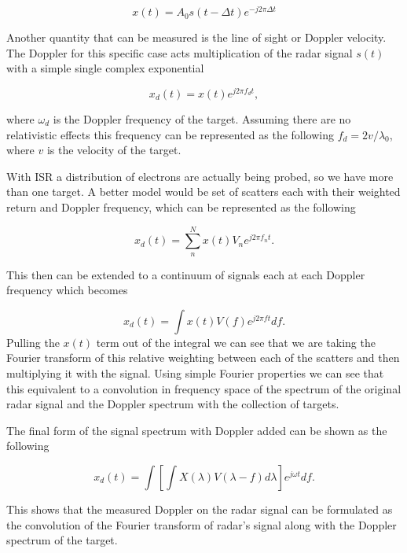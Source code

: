\begin{equation}
\label{eqn:baseband}
x(t)=A_0s(t-\Delta t)e^{-j2\pi\Delta t}
\end{equation}

Another quantity that can be measured is the line of sight or Doppler velocity. The Doppler for this specific case acts multiplication of the radar signal $s(t)$ with a simple single complex exponential

\begin{equation}
\label{simpledop}
x_d(t) = x(t)e^{j2\pi f_d t},
\end{equation}
 
\noindent where $\omega_d$ is the Doppler frequency of the target. Assuming there are no relativistic effects this frequency can be represented as the following $f_d = 2v/\lambda_0 $, where $v$ is the velocity of the target. 

With ISR a distribution of electrons are actually being probed, so we have more than one target. A better model would be set of scatters each with their weighted return and Doppler frequency, which can be represented as the following

\begin{equation}
\label{multiDop}
\displaystyle x_d(t) = \sum_{n}^{N} x(t)V_ne^{j2\pi f_{n} t}.
\end{equation}

\noindent This then can be extended to a continuum of signals each at each Doppler frequency which becomes

\begin{equation}
\label{conDop}
x_d(t) = \int x(t) V(f)e^{j2\pi ft} df.
\end{equation}
\noindent Pulling the $x(t)$ term out of the integral we can see that we are taking the Fourier transform of this relative weighting between each of the scatters and then multiplying it with the signal.  Using simple Fourier properties we can see that this equivalent to a convolution in frequency space of the spectrum of the original radar signal and the Doppler spectrum with the collection of targets.  

The final form of the signal spectrum with Doppler added can be shown as the following

\begin{equation}
\label{finalDop}
x_d(t) = \int \left[\int X(\lambda)V(\lambda-f)d\lambda\right] e^{j\omega t}df.
\end{equation}

\noindent This shows that the measured Doppler on the radar signal can be formulated as the convolution of the Fourier transform of radar's signal along with the Doppler spectrum of the target.

